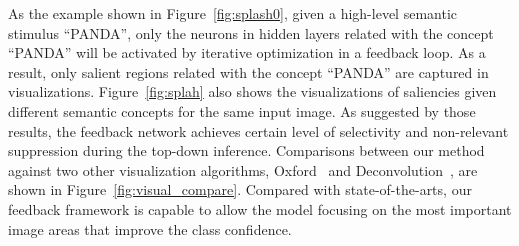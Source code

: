 As the example shown in Figure~\ref{fig:splash0}, given a high-level semantic stimulus ``PANDA'', only the neurons in hidden layers related with the concept ``PANDA'' will be activated by iterative optimization in a feedback loop. As a result, only salient regions related with the concept ``PANDA'' are captured in visualizations. Figure~\ref{fig:splah} also shows the visualizations of saliencies given different semantic concepts for the same input image. As suggested by those results, the feedback network achieves certain level of selectivity and non-relevant suppression during the top-down inference. Comparisons between our method against two other visualization algorithms, Oxford~\cite{simonyan2013deep} and Deconvolution~\cite{zeiler2014visualizing}, are shown in Figure~\ref{fig:visual_compare}. Compared with state-of-the-arts, our feedback framework is capable to allow the model focusing on the most important image areas that improve the class confidence.

